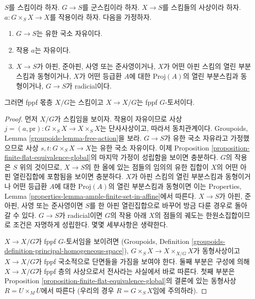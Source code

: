 \begin{lemma}
\label{lemma-quotient-scheme}
$S$를 스킴이라 하자. $G \to S$를 군스킴이라 하자. $X \to S$를
스킴들의 사상이라 하자. $a : G \times_S X \to X$를 작용이라 하자.
다음을 가정하자.
\begin{enumerate}
\item $G \to S$는 유한 국소 자유이다.
\item 작용 $a$는 자유이다.
\item $X \to S$가 아핀, 준아핀, 사영 또는 준사영이거나,
$X$가 어떤 아핀 스킴의 열린 부분스킴과 동형이거나, $X$가 어떤 등급환
$A$에 대한 $\text{Proj}(A)$의 열린 부분스킴과 동형이거나,
$G \to S$가 radicial이다.
\end{enumerate}
그러면 fppf 몫층 $X/G$는 스킴이고 $X \to X/G$는 fppf $G$-토서이다.
\end{lemma}

\begin{proof}
먼저 $X/G$가 스킴임을 보이자. 작용이 자유이므로 사상
$j = (a, \text{pr}) : G \times_S X \to X \times_S X$는 단사사상이고,
따라서 동치관계이다. Groupoids, Lemma
\ref{groupoids-lemma-free-action}을 보라. $G \to S$가 유한 국소
자유라고 가정했으므로 사상 $s, t : G \times_S X \to X$는 유한
국소 자유이다. 이제 Proposition
\ref{proposition-finite-flat-equivalence-global}의 마지막 가정이
성립함을 보이면 충분하다. $G$의 작용은 $S$ 위의 것이므로,
$X \to S$의 한 올에 있는 점들의 임의의 유한 집합이 $X$의 어떤 아핀
열린집합에 포함됨을 보이면 충분하다. $X$가 아핀 스킴의 열린 부분스킴과
동형이거나 어떤 등급환 $A$에 대한 $\text{Proj}(A)$의 열린 부분스킴과
동형이면 이는 Properties, Lemma
\ref{properties-lemma-ample-finite-set-in-affine}에서 따른다.
$X \to S$가 아핀, 준아핀, 사영 또는 준사영이면 $S$를 한 아핀
열린집합으로 바꾸어 방금 다룬 경우로 돌아갈 수 있다. $G \to S$가
radicial이면 $G$의 작용 아래 $X$의 점들의 궤도는 한원소집합이므로
조건은 자명하게 성립한다. 몇몇 세부사항은 생략한다.

\medskip\noindent
$X \to X/G$가 fppf $G$-토서임을 보이려면
(Groupoids, Definition
\ref{groupoids-definition-principal-homogeneous-space}),
$G \times_S X \to X \times_{X/G} X$가 동형사상이고 $X \to X/G$가
fppf 국소적으로 단면들을 가짐을 보여야 한다. 둘째 부분은 구성에 의해
$X \to X/G$가 fppf 층의 사상으로서 전사라는 사실에서 바로 따른다.
첫째 부분은 Proposition \ref{proposition-finite-flat-equivalence-global}의
결론에 있는 동형사상 $R = U \times_M U$에서 따른다
(우리의 경우 $R = G \times_S X$임에 주의하라).
\end{proof}

